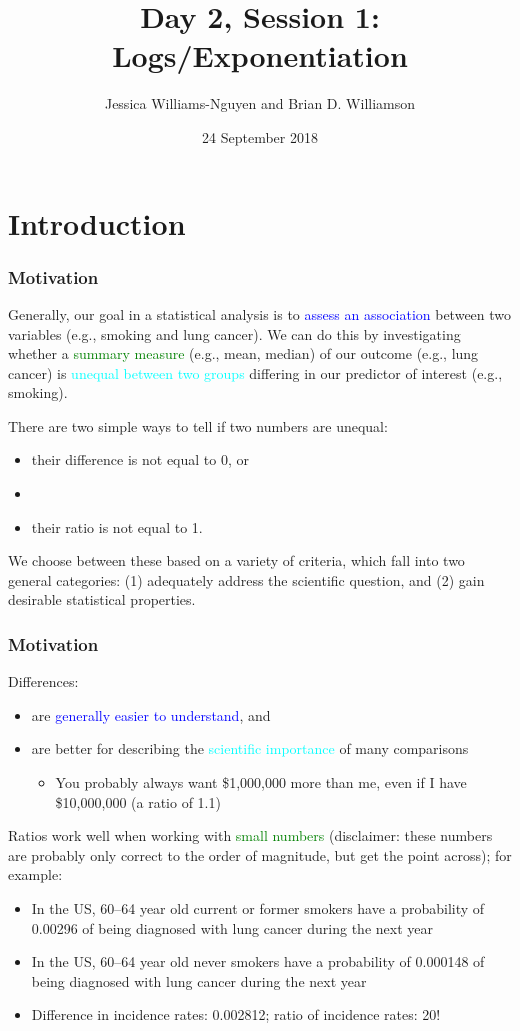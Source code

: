 \documentclass[11pt]{beamer}
\title{Day 2, Session 1: Logs/Exponentiation}
\author{Jessica Williams-Nguyen and Brian D. Williamson}
\institute{EPI/BIOST Bootcamp 2018}
\date{24 September 2018}
\newcommand{\myframe}[1]{\begin{frame} \frametitle{#1}}
\newenvironment{spaceitemize}
{ \begin{itemize}
    \setlength{\itemsep}{10pt}
    \setlength{\parskip}{0pt}
    \setlength{\parsep}{0pt}     }
{ \end{itemize}                  }
\begin{document}
\begin{frame}
\titlepage
\end{frame}

\section{Introduction}
\myframe{Motivation}
Generally, our goal in a statistical analysis is to \textcolor{blue}{assess an association} between two variables (e.g., smoking and lung cancer). We can do this by investigating whether a \textcolor{green}{summary measure} (e.g., mean, median) of our outcome (e.g., lung cancer) is \textcolor{cyan}{unequal between two groups} differing in our predictor of interest (e.g., smoking).

There are two simple ways to tell if two numbers are unequal: 
\begin{itemize}
\item their difference is not equal to 0, or
\item[]
\item their ratio is not equal to 1.
\end{itemize}

We choose between these based on a variety of criteria, which fall into two general categories: (1) adequately address the scientific question, and (2) gain desirable statistical properties.
\end{frame}

\myframe{Motivation}
Differences:
\vspace{-0.5cm}
\begin{spaceitemize}
\item are \textcolor{blue}{generally easier to understand}, and 
\item are better for describing the \textcolor{cyan}{scientific importance} of many comparisons
\begin{itemize}
\item You probably always want \$1,000,000 more than me, even if I have \$10,000,000 (a ratio of 1.1)
\end{itemize}
\end{spaceitemize}
Ratios work well when working with \textcolor{green}{small numbers} (disclaimer: these numbers are probably only correct to the order of magnitude, but get the point across); for example:
{\fontsize{10pt}{7.2}\selectfont
\begin{itemize}
\item In the US, 60--64 year old current or former smokers have a probability of 0.00296 of being diagnosed with lung cancer during the next year
\item In the US, 60--64 year old never smokers have a probability of 0.000148 of being diagnosed with lung cancer during the next year
\item Difference in incidence rates: 0.002812; ratio of incidence rates: 20!
\end{itemize}
}
\end{frame}
\end{document}
